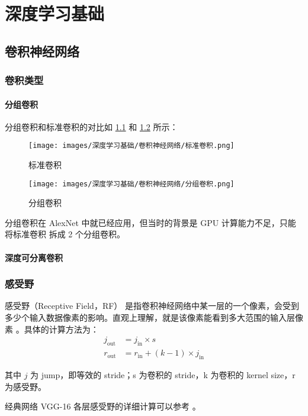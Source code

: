 \part{深度学习基础}

\chapter{卷积神经网络}

\section{卷积类型}

\subsection{分组卷积}

分组卷积和标准卷积的对比如 \ref{fig:normal-conv} 和 \ref{fig:group-conv} 所示：

\begin{figure}[ht]
  \centering
  \texttt{[image: images/深度学习基础/卷积神经网络/标准卷积.png]}
  \caption{标准卷积}
  \label{fig:normal-conv}
\end{figure}

\begin{figure}[ht]
  \centering
  \texttt{[image: images/深度学习基础/卷积神经网络/分组卷积.png]}
  \caption{分组卷积}
  \label{fig:group-conv}
\end{figure}

分组卷积在 AlexNet 中就已经应用，但当时的背景是 GPU 计算能力不足，只能将标准卷积
拆成 2 个分组卷积\cite{2012-AlexNet}。 

\subsection{深度可分离卷积}

\section{感受野}

感受野（Receptive Field，RF） 是指卷积神经网络中某一层的一个像素，会受到多少个输入数据像素的影响。直观上理解，就是该像素能看到多大范围的输入层像素 \cite{2017-Guide-to-RF-cal}。具体的计算方法为：
\begin{align}
j_{\mathrm {out}} & = j_{\mathrm{in}} \times s \\
r_{\mathrm {out}} & = r_{\mathrm{in}} + (k-1) \times j_{\mathrm{in}}
\end{align}

其中 $j$ 为 jump，即等效的 stride；s 为卷积的 stride，k 为卷积的 kernel size，r 为感受野。

经典网络 VGG-16 各层感受野的详细计算可以参考 \cite{2018-VGG-16-RF-cal}。

